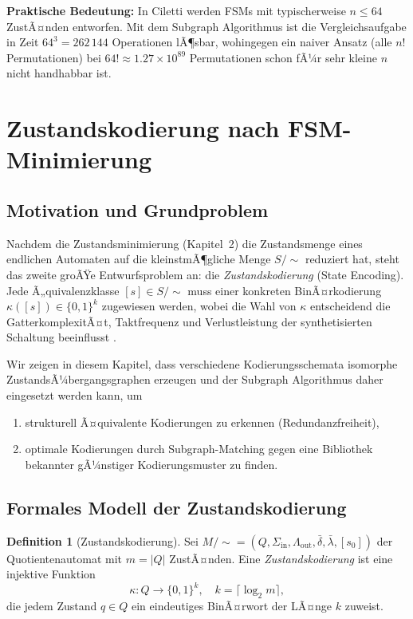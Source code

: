 ﻿\documentclass[a4paper,12pt]{article}
\theoremstyle{definition}
\newtheorem{definition}{Definition}
\begin{document}
\textbf{Praktische Bedeutung:} In Ciletti \cite[Kap.~3]{ciletti2011} werden FSMs mit
typischerweise $n \leq 64$ ZustÃ¤nden entworfen. Mit dem Subgraph Algorithmus ist die
Vergleichsaufgabe in Zeit $64^3 = 262\,144$ Operationen lÃ¶sbar, wohingegen ein naiver
Ansatz (alle $n!$ Permutationen) bei $64! \approx 1.27 \times 10^{89}$ Permutationen
schon fÃ¼r sehr kleine $n$ nicht handhabbar ist.

\section{Zustandskodierung nach FSM-Minimierung}

\subsection{Motivation und Grundproblem}

Nachdem die Zustandsminimierung (Kapitel~2) die Zustandsmenge eines endlichen Automaten
auf die kleinstmÃ¶gliche Menge $S/{\sim}$ reduziert hat, steht das zweite groÃŸe
Entwurfsproblem an: die \emph{Zustandskodierung} (State Encoding). Jede Ã„quivalenzklasse
$[s] \in S/{\sim}$ muss einer konkreten BinÃ¤rkodierung $\kappa([s]) \in \{0,1\}^k$
zugewiesen werden, wobei die Wahl von $\kappa$ entscheidend die GatterkomplexitÃ¤t,
Taktfrequenz und Verlustleistung der synthetisierten Schaltung beeinflusst
\cite[Kap.~3, S.~96--107]{ciletti2011}.

Wir zeigen in diesem Kapitel, dass verschiedene Kodierungsschemata isomorphe
ZustandsÃ¼bergangsgraphen erzeugen und der Subgraph Algorithmus daher eingesetzt werden
kann, um
\begin{enumerate}
  \item strukturell Ã¤quivalente Kodierungen zu erkennen (Redundanzfreiheit),
  \item optimale Kodierungen durch Subgraph-Matching gegen eine Bibliothek bekannter
        gÃ¼nstiger Kodierungsmuster zu finden.
\end{enumerate}

\subsection{Formales Modell der Zustandskodierung}

\begin{definition}[Zustandskodierung]\label{def:zkodierung}
  Sei $M/{\sim} = (Q, \Sigma_{\text{in}}, \Lambda_{\text{out}}, \bar\delta, \bar\lambda, [s_0])$
  der Quotientenautomat mit $m = |Q|$ ZustÃ¤nden. Eine \emph{Zustandskodierung} ist eine
  injektive Funktion
  \[
    \kappa: Q \to \{0,1\}^k, \quad k = \lceil \log_2 m \rceil,
  \]
  die jedem Zustand $q \in Q$ ein eindeutiges BinÃ¤rwort der LÃ¤nge $k$ zuweist.
\end{definition}
\end{document}
